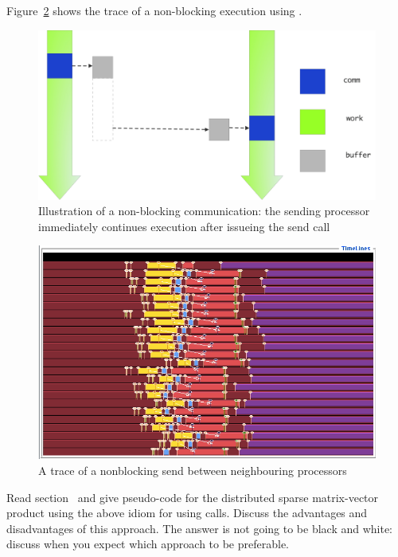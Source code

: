 Figure~\ref{fig:jump-nonblock} shows the trace of a non-blocking execution
using .
\begin{figure}[ht]
\includegraphics[scale=.1]{graphics/send-nonblocking}
\caption{Illustration of a non-blocking communication: the sending processor immediately continues execution after issueing the send call}
\label{fig:send-nonblocking}
\end{figure}
\begin{figure}[ht]
\includegraphics[scale=.4]{graphics/linear-nonblock}
\caption{A trace of a nonblocking send between neighbouring processors}
\label{fig:jump-nonblock}
\end{figure}

\begin{exercise}
  Read section~ and give pseudo-code for the
    distributed sparse matrix-vector product using the above idiom for
    using  calls. Discuss the advantages and
    disadvantages of this approach. The answer is not going to be
    black and white: discuss when you expect which approach to be
    preferable.
\end{exercise}


